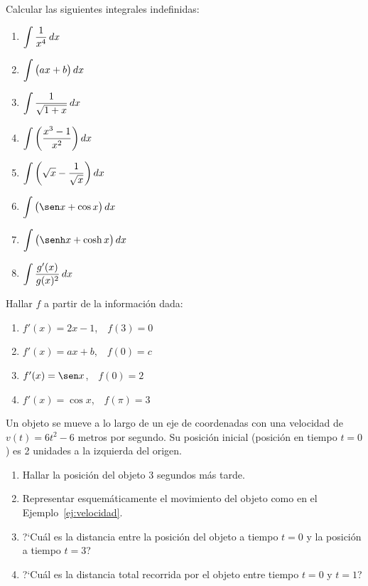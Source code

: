 \item Calcular las siguientes integrales indefinidas:
\begin{multicols}{2}
  \begin{enumerate}
    \item $\displaystyle \int \frac{1}{x^4} \,dx$
    \item $\displaystyle \int \big(ax+b\big) \,dx$
    \item $\displaystyle \int \frac{1}{\sqrt{1+x}} \,dx$
    \item $\displaystyle \int \bigg(\frac{x^3-1}{x^2}\bigg) \,dx$
    \item $\displaystyle \int \bigg(\sqrt{x}-\frac{1}{\sqrt{x}}\bigg) \,dx$
    \item $\D \int \big(\sen x+\cos x\big) \dx$
    \item $\D \int \big(\senh x+\cosh x\big) \dx$
    \item $\displaystyle \int \frac{g'(x)}{g(x)^2} \,dx$
  \end{enumerate}
\end{multicols}

\item Hallar $f$ a partir de la información dada:
\begin{multicols}{2}
  \begin{enumerate}
    \item $f'(x)=2x-1$,\ \ $f(3)= 0$
    \item $f'(x)=ax+b$,\ \ $f(0)=c $
    \item $f'(x)=\sen x$,\ \ $f(0)= 2$
    \item $f'(x)=\cos x$,\ \ $f(\pi )=3 $
  \end{enumerate}
\end{multicols}

\item Un objeto se mueve a lo largo de un eje de coordenadas con una velocidad de $v(t)=6t^2-6$ metros por segundo. Su posición inicial (posición en tiempo $t=0$) es 2 unidades a la izquierda del origen.
\begin{enumerate}
  \item Hallar la posición del objeto $3$ segundos más tarde.
  \item Representar esquemáticamente el movimiento del objeto como en el Ejemplo~\ref{ej:velocidad}.
  \item ?`Cuál es la distancia entre la posición del objeto a tiempo $t=0$ y la posición a tiempo $t=3$?
  \item ?`Cuál es la distancia total recorrida por el objeto entre tiempo $t=0$ y $t=1$?
\end{enumerate}